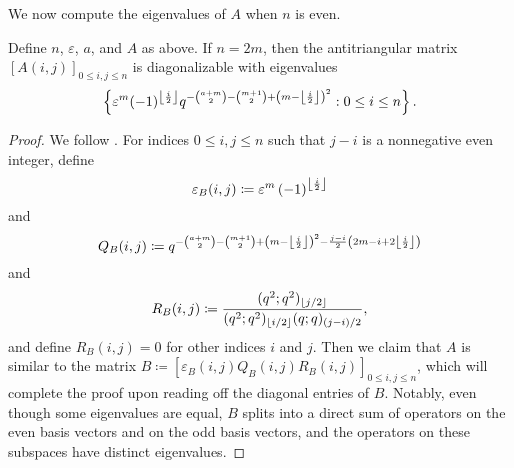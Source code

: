 We now compute the eigenvalues of $A$ when $n$ is even.
\begin{proposition} \label{prop:helper-matrix-even}
    Define $n$, $\varepsilon$, $a$, and $A$ as above. If $n=2m$, then the antitriangular matrix $[A(i,j)]_{0\le i,j\le n}$ is diagonalizable with eigenvalues
    \[\left\{\varepsilon^{m}(-1)^{\left\lfloor{\frac i2}\right\rfloor}q^{-\binom{a+m}2-\binom{m+1}2+\left(m-\left\lfloor{\frac i2}\right\rfloor\right)^2}:0\le i\le n\right\}.\]
\end{proposition}
\begin{proof}
    We follow . For indices $0\le i,j\le n$ such that $j-i$ is a nonnegative even integer, define
    \[\varepsilon_B(i,j)\coloneqq\varepsilon^{m}\left(-1\right)^{\left\lfloor{\frac{i}{2}}\right\rfloor}\]
    and
    \[Q_B(i,j)\coloneqq q^{-\binom{a+m}2-\binom{m+1}2+\left(m-\left\lfloor{\frac{i}{2}}\right\rfloor\right)^{2}-\frac{j-i}{2}\left(2m-i+2\left\lfloor{\frac{i}{2}}\right\rfloor\right)}\]
    and
    \[R_B(i,j)\coloneqq\frac{(q^2;q^2)_{\left\lfloor{j/2}\right\rfloor}}{(q^2;q^2)_{\left\lfloor{i/2}\right\rfloor}(q;q)_{(j-i)/2}},\]
    and define $R_B(i,j)=0$ for other indices $i$ and $j$. Then we claim that $A$ is similar to the matrix $B\coloneqq[\varepsilon_B(i,j)Q_B(i,j)R_B(i,j)]_{0\le i,j\le n}$, which will complete the proof upon reading off the diagonal entries of $B$. Notably, even though some eigenvalues are equal, $B$ splits into a direct sum of operators on the even basis vectors and on the odd basis vectors, and the operators on these subspaces have distinct eigenvalues.


\end{proof}
